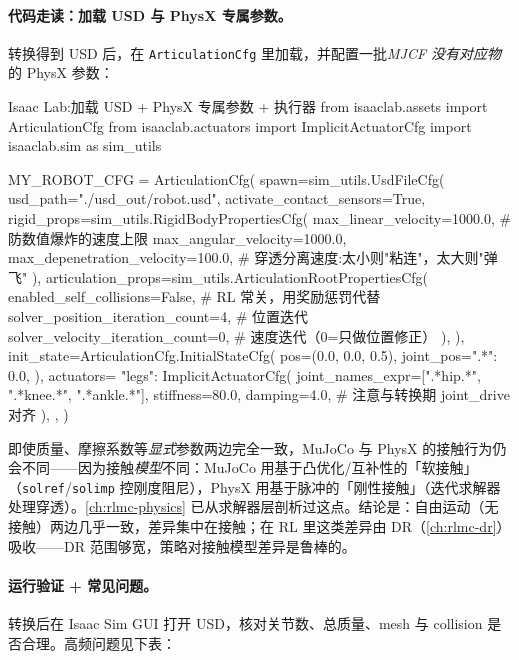 \paragraph{代码走读：加载 USD 与 PhysX 专属参数。}转换得到 USD 后，在 \texttt{ArticulationCfg} 里加载，并配置一批\emph{MJCF 没有对应物}的 PhysX 参数：

\begin{codebox}[Python]{Isaac Lab:加载 USD + PhysX 专属参数 + 执行器}
from isaaclab.assets import ArticulationCfg
from isaaclab.actuators import ImplicitActuatorCfg
import isaaclab.sim as sim_utils

MY_ROBOT_CFG = ArticulationCfg(
    spawn=sim_utils.UsdFileCfg(
        usd_path="./usd_out/robot.usd",
        activate_contact_sensors=True,
        rigid_props=sim_utils.RigidBodyPropertiesCfg(
            max_linear_velocity=1000.0,        # 防数值爆炸的速度上限
            max_angular_velocity=1000.0,
            max_depenetration_velocity=100.0,  # 穿透分离速度:太小则"粘连"，太大则"弹飞"
        ),
        articulation_props=sim_utils.ArticulationRootPropertiesCfg(
            enabled_self_collisions=False,     # RL 常关，用奖励惩罚代替
            solver_position_iteration_count=4, # 位置迭代
            solver_velocity_iteration_count=0, # 速度迭代（0=只做位置修正）
        ),
    ),
    init_state=ArticulationCfg.InitialStateCfg(
        pos=(0.0, 0.0, 0.5), joint_pos={".*": 0.0},
    ),
    actuators={
        "legs": ImplicitActuatorCfg(
            joint_names_expr=[".*hip.*", ".*knee.*", ".*ankle.*"],
            stiffness=80.0, damping=4.0,       # 注意与转换期 joint_drive 对齐
        ),
    },
)
\end{codebox}

\begin{insight}\label{ins:rlmc-assets-contact-models}
即使质量、摩擦系数等\emph{显式}参数两边完全一致，MuJoCo 与 PhysX 的接触行为仍会不同——因为接触\emph{模型}不同：MuJoCo 用基于凸优化/互补性的「软接触」（\texttt{solref}/\allowbreak\texttt{solimp} 控刚度阻尼），PhysX 用基于脉冲的「刚性接触」（迭代求解器处理穿透）。\cref{ch:rlmc-physics} 已从求解器层剖析过这点。结论是：自由运动（无接触）两边几乎一致，差异集中在接触；在 RL 里这类差异由 DR（\cref{ch:rlmc-dr}）吸收——DR 范围够宽，策略对接触模型差异是鲁棒的。
\end{insight}

\paragraph{运行验证 + 常见问题。}转换后在 Isaac Sim GUI 打开 USD，核对关节数、总质量、mesh 与 collision 是否合理。高频问题见下表：

